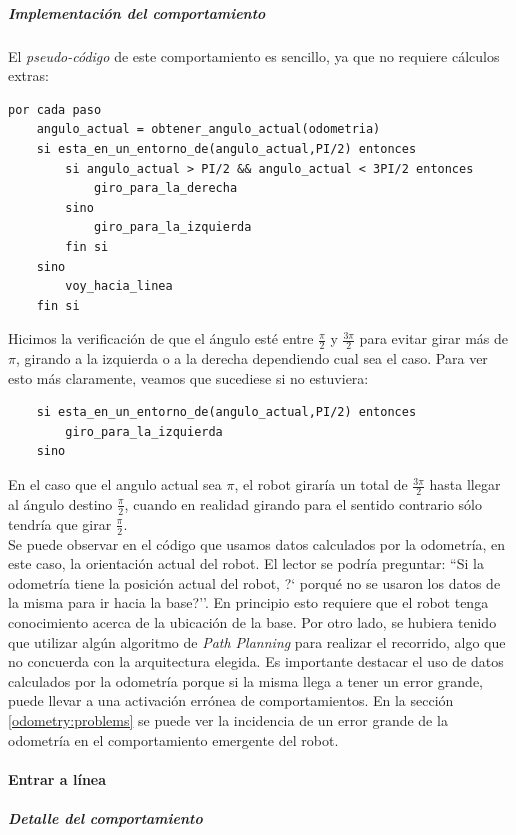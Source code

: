 \subparagraph{Implementaci\'on del comportamiento}
El \emph{pseudo-c\'odigo} de este comportamiento es sencillo, ya que
no requiere c\'alculos extras:

\begin{verbatim}
por cada paso
    angulo_actual = obtener_angulo_actual(odometria)
    si esta_en_un_entorno_de(angulo_actual,PI/2) entonces
        si angulo_actual > PI/2 && angulo_actual < 3PI/2 entonces
            giro_para_la_derecha
        sino
            giro_para_la_izquierda
        fin si
    sino
        voy_hacia_linea
    fin si
\end{verbatim}

Hicimos la verificaci\'on de que el \'angulo est\'e entre $\frac{\pi}{2}$ y
$\frac{3\pi}{2}$ para evitar girar m\'as de $\pi$, girando a la izquierda o a
la derecha dependiendo cual sea el caso. Para ver esto m\'as claramente,
veamos que sucediese si no estuviera:
\begin{verbatim}
    si esta_en_un_entorno_de(angulo_actual,PI/2) entonces
        giro_para_la_izquierda
    sino
\end{verbatim}
En el caso que el angulo actual sea $\pi$, el robot girar\'ia un total de
$\frac{3\pi}{2}$ hasta llegar al \'angulo destino $\frac{\pi}{2}$, cuando en
realidad girando para el sentido contrario s\'olo tendr\'ia que girar
$\frac{\pi}{2}$.
\\
Se puede observar en el c\'odigo que usamos datos calculados por la
odometr\'ia, en este caso, la orientaci\'on actual del robot. El lector se
podr\'ia preguntar: ``Si la odometr\'ia tiene la posici\'on actual del robot,
?` porqu\'e no se usaron los datos de la misma para ir hacia la base?''. En
principio esto requiere que el robot tenga conocimiento acerca de la ubicaci\'on
de la base. Por otro lado, se hubiera tenido que utilizar alg\'un algoritmo de
\emph{Path Planning} para realizar el recorrido, algo que no concuerda con
la arquitectura elegida. Es importante destacar el uso de datos calculados por
la odometr\'ia porque si la misma llega a tener un error grande, puede llevar a
una activaci\'on err\'onea de comportamientos. En la secci\'on
\ref{odometry:problems} se puede ver la incidencia de un error grande de la
odometr\'ia en el comportamiento emergente del robot.

\paragraph{Entrar a l\'inea}
\label{enter_line}
\subparagraph{Detalle del comportamiento}

